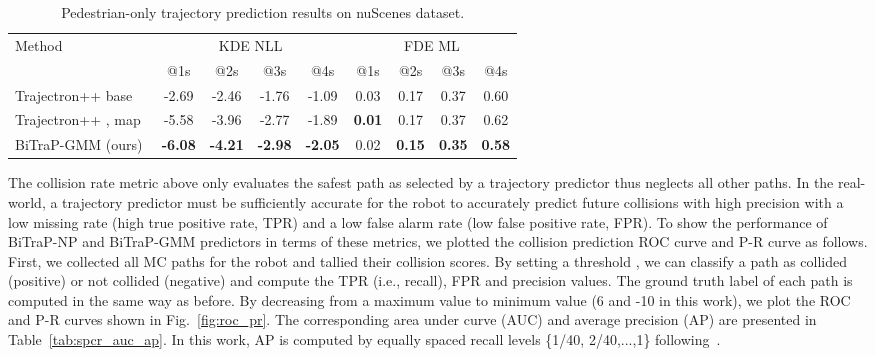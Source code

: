 \documentclass[letterpaper, 10 pt, conference]{ieeeconf}
\begin{document}
\begin{table*}[ht!]
    \centering
    \begin{tabular}{l|cccc|cccc}
        \toprule
        \multirow{2}{*}{Method} & \multicolumn{4}{c|}{KDE NLL} & \multicolumn{4}{c}{FDE ML} \\
        \cmidrule{2-9} 
        & @1s & @2s & @3s & @4s & @1s & @2s & @3s & @4s \\
        \midrule
        Trajectron++ base~\cite{salzmann2020trajectron++} & -2.69 & -2.46 & -1.76 & -1.09 & 0.03 & 0.17 & 0.37 & 0.60 \\
        Trajectron++ , map~\cite{salzmann2020trajectron++} & -5.58 & -3.96 & -2.77 & -1.89 & \textbf{0.01} & 0.17 & 0.37 & 0.62 \\
        BiTraP-GMM (ours) & \textbf{-6.08} & \textbf{-4.21} & \textbf{-2.98} & \textbf{-2.05} & 0.02 & \textbf{0.15} & \textbf{0.35} & \textbf{0.58} \\
        \bottomrule
    \end{tabular}
    \caption{Pedestrian-only trajectory prediction results on nuScenes dataset.}
    \label{tab:nuscenes_ped}
\end{table*}
 The collision rate metric above only evaluates the safest path as selected by a trajectory predictor thus neglects all other paths. In the real-world, a trajectory predictor must be sufficiently accurate for the robot to accurately predict future collisions with high precision with a low missing rate (high true positive rate, TPR) and a low false alarm rate (low false positive rate, FPR). To show the performance of BiTraP-NP and BiTraP-GMM predictors in terms of these metrics, we plotted the collision prediction ROC curve and P-R curve as follows. First, we collected all MC paths for the robot and tallied their collision scores. By setting a threshold , we can classify a path as collided (positive) or not collided (negative) and compute the TPR (i.e., recall), FPR and precision values. The ground truth label of each path is computed in the same way as before. By decreasing  from a maximum value to minimum value (6 and -10 in this work), we plot the ROC and P-R curves shown in Fig.~\ref{fig:roc_pr}. The corresponding area under curve (AUC) and average precision (AP) are presented in Table~\ref{tab:spcr_auc_ap}. In this work, AP is computed by equally spaced recall levels \{1/40, 2/40,...,1\} following~\cite{simonelli2019monodis}.
\end{document}
